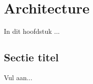 \chapter{Architecture}
\label{chap:evaluation}

In dit hoofdstuk ...

\section{Sectie titel}
\label{sec:scalable_faafo}

Vul aan...
